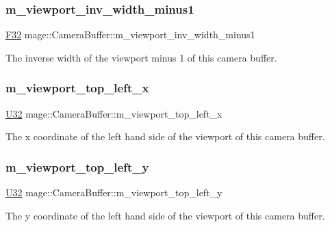 \subsubsection{\texorpdfstring{m\+\_\+viewport\+\_\+inv\+\_\+width\+\_\+minus1}{m\_viewport\_inv\_width\_minus1}}
{\footnotesize\ttfamily \hyperlink{namespacemage_aa97e833b45f06d60a0a9c4fc22ae02c0}{F32} mage\+::\+Camera\+Buffer\+::m\+\_\+viewport\+\_\+inv\+\_\+width\+\_\+minus1}

The inverse width of the viewport minus 1 of this camera buffer. \hypertarget{structmage_1_1_camera_buffer_aa1a4a218d604beb0777e9286daad8c8b}{}\label{structmage_1_1_camera_buffer_aa1a4a218d604beb0777e9286daad8c8b} 
\subsubsection{\texorpdfstring{m\+\_\+viewport\+\_\+top\+\_\+left\+\_\+x}{m\_viewport\_top\_left\_x}}
{\footnotesize\ttfamily \hyperlink{namespacemage_a41c104c036fba3756a74e19f793eeaa1}{U32} mage\+::\+Camera\+Buffer\+::m\+\_\+viewport\+\_\+top\+\_\+left\+\_\+x}

The x coordinate of the left hand side of the viewport of this camera buffer. \hypertarget{structmage_1_1_camera_buffer_af3200b46348fecc86ecca3717767ae6b}{}\label{structmage_1_1_camera_buffer_af3200b46348fecc86ecca3717767ae6b} 
\subsubsection{\texorpdfstring{m\+\_\+viewport\+\_\+top\+\_\+left\+\_\+y}{m\_viewport\_top\_left\_y}}
{\footnotesize\ttfamily \hyperlink{namespacemage_a41c104c036fba3756a74e19f793eeaa1}{U32} mage\+::\+Camera\+Buffer\+::m\+\_\+viewport\+\_\+top\+\_\+left\+\_\+y}

The y coordinate of the left hand side of the viewport of this camera buffer. \hypertarget{structmage_1_1_camera_buffer_a9aec8f6ee54281ae7ec410be846c3658}{}\label{structmage_1_1_camera_buffer_a9aec8f6ee54281ae7ec410be846c3658} 
